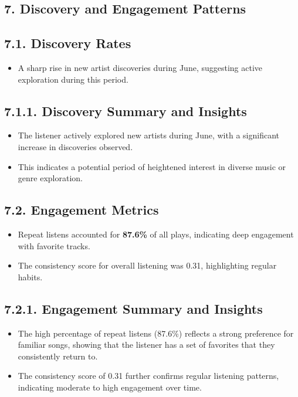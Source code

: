 \documentclass[12pt]{article}
\begin{document}
\begin{itemize}
\section*{7. Discovery and Engagement Patterns}

\subsection*{7.1. Discovery Rates}
\begin{itemize}
    \item A sharp rise in new artist discoveries during June, suggesting active exploration during this period.
\end{itemize}

\subsection*{7.1.1. Discovery Summary and Insights}
\begin{itemize}
    \item The listener actively explored new artists during June, with a significant increase in discoveries observed.
    \item This indicates a potential period of heightened interest in diverse music or genre exploration.
\end{itemize}

\subsection*{7.2. Engagement Metrics}
\begin{itemize}
    \item Repeat listens accounted for \textbf{87.6\%} of all plays, indicating deep engagement with favorite tracks.
    \item The consistency score for overall listening was 0.31, highlighting regular habits.
\end{itemize}

\subsection*{7.2.1. Engagement Summary and Insights}
\begin{itemize}
    \item The high percentage of repeat listens (87.6\%) reflects a strong preference for familiar songs, showing that the listener has a set of favorites that they consistently return to.
    \item The consistency score of 0.31 further confirms regular listening patterns, indicating moderate to high engagement over time.
\end{itemize}


\end{itemize}
\end{document}
